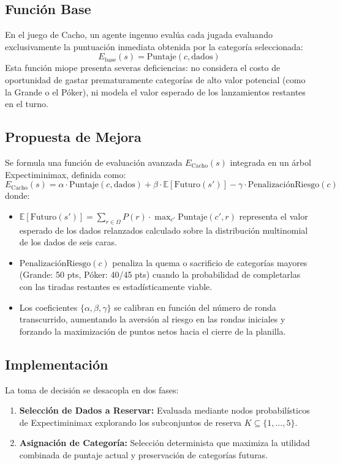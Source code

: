 \documentclass[10pt,a4paper]{article}
\begin{document}
\subsection{Función Base}
En el juego de Cacho, un agente ingenuo evalúa cada jugada evaluando exclusivamente la puntuación inmediata obtenida por la categoría seleccionada:
\begin{equation}
    E_{\text{base}}(s) = \text{Puntaje}(c, \text{dados})
\end{equation}
Esta función miope presenta severas deficiencias: no considera el costo de oportunidad de gastar prematuramente categorías de alto valor potencial (como la Grande o el Póker), ni modela el valor esperado de los lanzamientos restantes en el turno.

\subsection{Propuesta de Mejora}
Se formula una función de evaluación avanzada $E_{\text{Cacho}}(s)$ integrada en un árbol Expectiminimax, definida como:
\begin{equation}
    E_{\text{Cacho}}(s) = \alpha \cdot \text{Puntaje}(c, \text{dados}) + \beta \cdot \mathbb{E}[\text{Futuro}(s')] - \gamma \cdot \text{PenalizaciónRiesgo}(c)
\end{equation}
donde:
\begin{itemize}
    \item $\mathbb{E}[\text{Futuro}(s')] = \sum_{r \in \Omega} P(r) \cdot \max_{c'} \text{Puntaje}(c', r)$ representa el valor esperado de los dados relanzados calculado sobre la distribución multinomial de los dados de seis caras.
    \item $\text{PenalizaciónRiesgo}(c)$ penaliza la quema o sacrificio de categorías mayores (Grande: 50 pts, Póker: 40/45 pts) cuando la probabilidad de completarlas con las tiradas restantes es estadísticamente viable.
    \item Los coeficientes $\{\alpha, \beta, \gamma\}$ se calibran en función del número de ronda transcurrido, aumentando la aversión al riesgo en las rondas iniciales y forzando la maximización de puntos netos hacia el cierre de la planilla.
\end{itemize}

\subsection{Implementación}
La toma de decisión se desacopla en dos fases:
\begin{enumerate}
    \item \textbf{Selección de Dados a Reservar:} Evaluada mediante nodos probabilísticos de Expectiminimax explorando los subconjuntos de reserva $K \subseteq \{1, \dots, 5\}$.
    \item \textbf{Asignación de Categoría:} Selección determinista que maximiza la utilidad combinada de puntaje actual y preservación de categorías futuras.
\end{enumerate}
\end{document}
